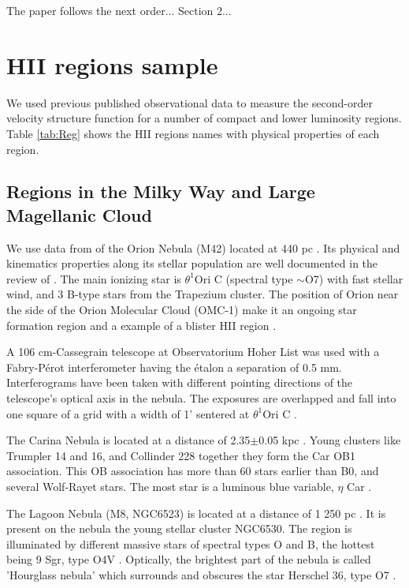 \documentclass[fleqn,usenatbib, useAMS, a4paper]{mnras}
\begin{document}
The paper follows the next order...
Section 2...

\section{HII regions sample}

We used previous published observational data to measure the second-order velocity structure function for a number of compact and lower luminosity regions. Table \ref{tab:Reg} shows the HII regions names
with physical properties of each region. 

\subsection{Regions in the Milky Way and Large Magellanic Cloud}
\label{sec:regions-milky-way}

We use data from \citet{1987A&A...176..347H} of the Orion Nebula (M42) located at 440 pc \citep{2008AJ....136.1566O}.
Its physical and kinematics properties along its stellar population are well documented in the review of \citet{2001ARA&A..39...99O}.
The main ionizing star is \(\theta^{1}\)Ori C (spectral type \(\sim\)O7) with fast stellar wind, and 3 B-type stars from the Trapezium cluster.
The position of Orion near the side of the Orion Molecular Cloud (OMC-1) make it an ongoing star formation region and a example of a blister HII region \citep{arthur2016turbulence}.

A 106 cm-Cassegrain telescope at Observatorium Hoher List was used with a Fabry-Pérot interferometer having the étalon a separation of 0.5 mm. 
Interferograms have been taken with different pointing directions of the telescope's optical axis in the nebula. 
The exposures are overlapped and fall into one square of a grid with a width of 1' sentered at \(\theta^{1}\)Ori C \citep{1987A&A...176..347H}.   

The Carina Nebula is located at a distance of 2.35$\pm$0.05 kpc \citep{2006ApJ...644.1151S}.
Young clusters like Trumpler 14 and 16, and Collinder 228 together they form the Car OB1 association.
This OB association has more than 60 stars earlier than B0, and several Wolf-Rayet stars.
The most star is a luminous blue variable, $\eta$ Car \citep{Damiani:2016a}.

The Lagoon Nebula (M8, NGC6523) is located at a distance of 1 250 pc \citep{2005A&A...430..941P}.
It is present on the nebula the young stellar cluster NGC6530.
The region is illuminated by different massive stars of spectral types O and B, the hottest being 9 Sgr, type O4V \citep{Damiani:2017b}.
Optically, the brightest part of the nebula is called 'Hourglass nebula' which surrounds and obscures the star Herschel 36, type O7 \citep{1986AJ.....91..870W}.
\end{document}

